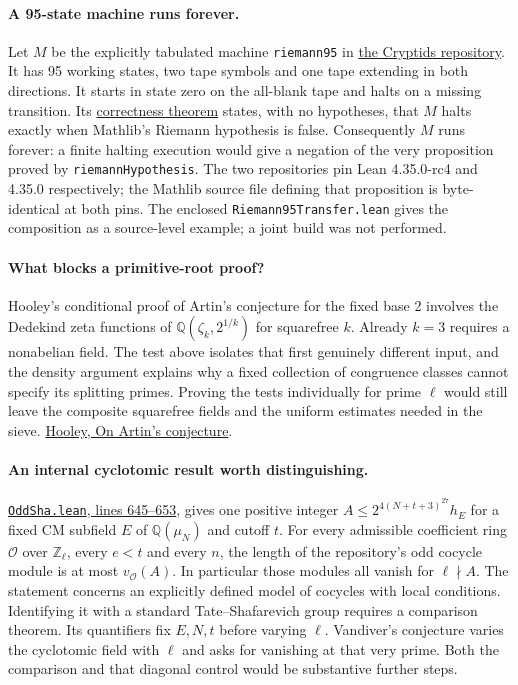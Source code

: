 \documentclass[11pt]{article}
\newcommand{\Q}{\mathbb Q}\newcommand{\R}{\mathbb R}
\newcommand{\repo}{https://github.com/lsernau/grh-lean/blob/72fead102f663d5c7a407964a13dc0cf9d977207}
\newcommand{\src}[2]{\href{\repo/grh/src/#1.lean}{#2}}
\begin{document}
\paragraph{A 95-state machine runs forever.}
Let $M$ be the explicitly tabulated machine \texttt{riemann95} in
\href{https://github.com/google-deepmind/cryptids/tree/30d3f611b16faeb13f4d8281204253d36e4fae01}{the Cryptids repository}.
It has 95 working states, two tape symbols and one tape extending in both directions.
It starts in state zero on the all-blank tape and halts on a missing transition.
Its \href{https://github.com/google-deepmind/cryptids/blob/30d3f611b16faeb13f4d8281204253d36e4fae01/Cryptids/Semantics/Riemann95.lean}{correctness theorem}
states, with no hypotheses, that $M$ halts exactly when Mathlib's Riemann hypothesis is false.
Consequently $M$ runs forever: a finite halting execution would give a negation of the very proposition proved by \texttt{riemannHypothesis}.
The two repositories pin Lean 4.35.0-rc4 and 4.35.0 respectively; the Mathlib source file defining that proposition is byte-identical at both pins. The enclosed \texttt{Riemann95Transfer.lean} gives the composition as a source-level example; a joint build was not performed.



\paragraph{What blocks a primitive-root proof?}
Hooley's conditional proof of Artin's conjecture for the fixed base 2 involves the Dedekind zeta functions of $\Q(\zeta_k,2^{1/k})$ for squarefree $k$. Already $k=3$ requires a nonabelian field. The test above isolates that first genuinely different input, and the density argument explains why a fixed collection of congruence classes cannot specify its splitting primes. Proving the tests individually for prime $\ell$ would still leave the composite squarefree fields and the uniform estimates needed in the sieve. \href{https://doi.org/10.1515/crll.1967.225.209}{Hooley, On Artin's conjecture}.

\paragraph{An internal cyclotomic result worth distinguishing.}
\src{Lib/Cyclotomic/OddSha}{\texttt{OddSha.lean}, lines 645--653}, gives one positive integer $A\le 2^{4(N+t+3)^{27}}h_E$ for a fixed CM subfield $E$ of $\Q(\mu_N)$ and cutoff $t$. For every admissible coefficient ring $\mathcal O$ over $\mathbb Z_\ell$, every $e<t$ and every $n$, the length of the repository's odd cocycle module is at most $v_{\mathcal O}(A)$. In particular those modules all vanish for $\ell\nmid A$. The statement concerns an explicitly defined model of cocycles with local conditions. Identifying it with a standard Tate--Shafarevich group requires a comparison theorem. Its quantifiers fix $E,N,t$ before varying $\ell$. Vandiver's conjecture varies the cyclotomic field with $\ell$ and asks for vanishing at that very prime. Both the comparison and that diagonal control would be substantive further steps.
\end{document}
